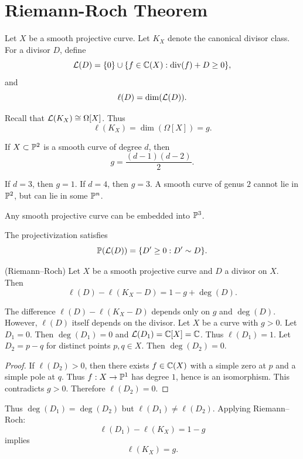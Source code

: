 
\section{Riemann-Roch Theorem}

Let $X$ be a smooth projective curve.
Let $K_X$ denote the canonical divisor class.
For a divisor $D$, define
\[
    \mathcal{L}(D) = \{0\}\cup\{f\in\mathbb{C}(X) : \mathrm{div}(f) + D \geq 0\},
\]
and
\[
    \ell(D) = \dim(\mathcal{L}(D)).
\]

Recall that $\mathcal{L}(K_X) \cong \Omega[X]$.
Thus
\[
    \ell(K_X) = \dim(\Omega[X]) = g.
\]

If $X \subset \mathbb{P}^2$ is a smooth curve of degree $d$, then
\[
    g = \frac{(d-1)(d-2)}{2}.
\]

If $d = 3$, then $g = 1$.
If $d = 4$, then $g = 3$.
A smooth curve of genus $2$ cannot lie in $\mathbb{P}^2$, but can lie in some $\mathbb{P}^n$.

\begin{theorem*}{
    Any smooth projective curve can be embedded into $\mathbb{P}^3$.
}
\end{theorem*}

The projectivization satisfies
\[
    \mathbb{P}(\mathcal{L}(D)) = \{D' \geq 0 : D' \sim D\}.
\]

\begin{theorem*}{
    (Riemann--Roch)
    Let $X$ be a smooth projective curve and $D$ a divisor on $X$.
    Then
    \[
        \ell(D) - \ell(K_X - D) = 1 - g + \deg(D).
    \]
}
\end{theorem*}

The difference $\ell(D) - \ell(K_X - D)$ depends only on $g$ and $\deg(D)$.
However, $\ell(D)$ itself depends on the divisor.
Let $X$ be a curve with $g > 0$.
Let $D_1 = 0$.
Then $\deg(D_1) = 0$ and $\mathcal{L}(D_1) = \mathbb{C}[X] = \mathbb{C}$.
Thus $\ell(D_1) = 1$.
Let $D_2 = p - q$ for distinct points $p,q \in X$.
Then $\deg(D_2) = 0$.

\begin{proof}
    If $\ell(D_2) > 0$, then there exists $f \in \mathbb{C}(X)$ with a simple zero at $p$ and a simple pole at $q$.
    Thus $f : X \to \mathbb{P}^1$ has degree $1$, hence is an isomorphism.
    This contradicts $g > 0$.
    Therefore $\ell(D_2) = 0$.
\end{proof}

Thus $\deg(D_1) = \deg(D_2)$ but $\ell(D_1) \neq \ell(D_2)$.
Applying Riemann--Roch:
\[
    \ell(D_1) - \ell(K_X) = 1 - g
\]
implies
\[
    \ell(K_X) = g.
\]

